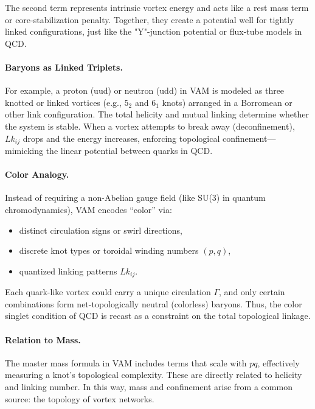 The second term represents intrinsic vortex energy and acts like a rest mass term or core-stabilization penalty. Together, they create a potential well for tightly linked configurations, just like the "Y"-junction potential or flux-tube models in QCD.

\vspace{0.5em}
\paragraph{Baryons as Linked Triplets.} For example, a proton (uud) or neutron (udd) in VAM is modeled as three knotted or linked vortices (e.g., \( 5_2 \) and \( 6_1 \) knots) arranged in a Borromean or other link configuration. The total helicity and mutual linking determine whether the system is stable. When a vortex attempts to break away (deconfinement), \( Lk_{ij} \) drops and the energy increases, enforcing topological confinement—mimicking the linear potential between quarks in QCD.

\vspace{0.5em}
\paragraph{Color Analogy.} Instead of requiring a non-Abelian gauge field (like SU(3) in quantum chromodynamics), VAM encodes “color” via:
\begin{itemize}
    \item distinct circulation signs or swirl directions,
    \item discrete knot types or toroidal winding numbers \( (p, q) \),
    \item quantized linking patterns \( Lk_{ij} \).
\end{itemize}

Each quark-like vortex could carry a unique circulation \( \Gamma \), and only certain combinations form net-topologically neutral (colorless) baryons. Thus, the color singlet condition of QCD is recast as a constraint on the total topological linkage.

\vspace{0.5em}
\paragraph{Relation to Mass.} The master mass formula in VAM includes terms that scale with \( p q \), effectively measuring a knot’s topological complexity. These are directly related to helicity and linking number. In this way, mass and confinement arise from a common source: the topology of vortex networks.

